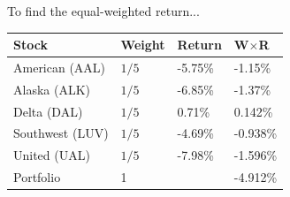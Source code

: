 To find the equal-weighted return...
\begin{center}
	{\color{blue}
	\begin{tabular}{l|lll}
		\textbf{Stock} & \textbf{W}eight & \textbf{R}eturn & \textbf{W}$\times$\textbf{R}\\ \hline
		American (AAL) & $1/5$ & -5.75\% & -1.15\% \\
		Alaska (ALK) & $1/5$ & -6.85\% & -1.37\% \\
		Delta (DAL) & $1/5$ & 0.71\% & 0.142\% \\
		Southwest (LUV) & $1/5$ & -4.69\% & -0.938\% \\
		United (UAL) & $1/5$ & -7.98\% & -1.596\% \\ \hline 
		Portfolio & 1 && -4.912\% \\\hline
	\end{tabular}
	}
\end{center}